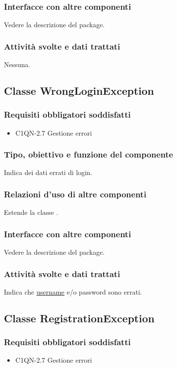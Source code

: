 \subsubsection*{Interfacce con altre componenti}
Vedere la descrizione del package.
\subsubsection*{Attivit\`a svolte e dati trattati}
Nessuna.

\subsection{Classe WrongLoginException}
\subsubsection*{Requisiti obbligatori soddisfatti}
\begin{itemize}
	\item C1QN-2.7 Gestione errori
\end{itemize}
\subsubsection*{Tipo, obiettivo e funzione del componente}
Indica dei dati errati di login.
\subsubsection*{Relazioni d'uso di altre componenti}
Estende la classe .
\subsubsection*{Interfacce con altre componenti}
Vedere la descrizione del package.
\subsubsection*{Attivit\`a svolte e dati trattati}
Indica che \underline{username} e/o password sono errati.

\subsection{Classe RegistrationException}
\subsubsection*{Requisiti obbligatori soddisfatti}
\begin{itemize}
	\item C1QN-2.7 Gestione errori
\end{itemize}
